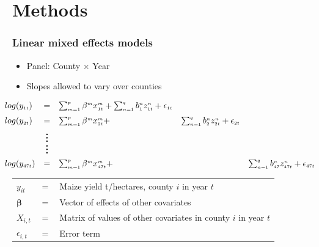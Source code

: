 \documentclass{beamer}              %
\begin{document}
\section{Methods}

\begin{frame}
\frametitle{Linear mixed effects models}\label{Methods} 

\begin{itemize}
\item Panel: County $\times$ Year
\item Slopes allowed to vary over counties
\end{itemize}


\begingroup
\everymath{\small}

\begin{align*}
\hspace{-0.5cm} \begin{array}{lclll}
 log(y_{\scriptscriptstyle 1t} )&=&\sum_{\scriptscriptstyle m=1}^{\scriptscriptstyle p} \beta^{\scriptscriptstyle m}x^{\scriptscriptstyle m}_{\scriptscriptstyle 1t}+ \sum_{\scriptscriptstyle n=1}^{\scriptscriptstyle q}b^{\scriptscriptstyle n}_{\scriptscriptstyle 1}z^{\scriptscriptstyle n}_{\scriptscriptstyle 1t}+\epsilon_{\scriptscriptstyle 1t} \\[2mm]
 log(y_{\scriptscriptstyle 2t} )&=&\sum_{\scriptscriptstyle m=1}^{\scriptscriptstyle p} \beta^{\scriptscriptstyle m}x^{\scriptscriptstyle m}_{\scriptscriptstyle 2t}+ &\sum_{\scriptscriptstyle n=1}^{\scriptscriptstyle q}b^{\scriptscriptstyle n}_{\scriptscriptstyle 2}z^{\scriptscriptstyle n}_{\scriptscriptstyle 2t}+\epsilon_{\scriptscriptstyle 2t}\\[1mm]
  &\huge{\vdots}\\[-2mm]
  & \huge{\vdots} \\[1mm]
  log(y_{\scriptscriptstyle 47t} )&=&\sum_{\scriptscriptstyle m=1}^{\scriptscriptstyle p} \beta^{\scriptscriptstyle m}x^{\scriptscriptstyle m}_{\scriptscriptstyle 47t}+ &&\sum_{\scriptscriptstyle n=1}^{\scriptscriptstyle q}b^{\scriptscriptstyle n}_{\scriptscriptstyle 47}z^{\scriptscriptstyle n}_{\scriptscriptstyle 47t}+\epsilon_{\scriptscriptstyle 47t}
\end{array}
\end{align*}
\endgroup




\begin{table}
\begin{small}
\begin{tabular}{lll}


$y_{it}$ &$=$& Maize yield t/hectares, county $i$ in year $t$\\
$\boldsymbol{\beta}$ &$=$& Vector of effects of other covariates\\
$X_{i,t}$ &$=$& Matrix of values of other covariates in county $i$ in year $t$\\
$\epsilon_{i,t}$ &$=$& Error term \\
\end{tabular}
\end{small}
\end{table}

\end{frame}
\end{document}
